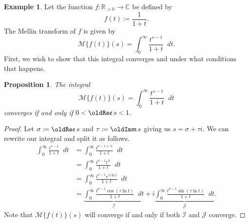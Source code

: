 \documentclass[a4paper]{article}
\newcommand*\diff{\mathop{}\!d} %
\newcommand{\R}{\mathbb{R}}
\newcommand{\C}{\mathbb{C}}
\renewcommand{\Im}{\mathop{\oldIm\mathfrak{m}}}
\renewcommand{\Re}{\mathop{\oldRe\mathfrak{e}}}
\newtheorem{proposition}[theorem]{Proposition}
\theoremstyle{definition}
\newtheorem{example}[theorem]{Example}
\begin{document}
\begin{example}
    Let the function $f \colon \R_{>0} \to \C$ be defined by
    \begin{equation*}
        f(t) \coloneq \frac{1}{1+t}.
    \end{equation*}
    The Mellin transform of $f$ is given by
    \begin{equation*}
        \mathcal{M}\{f(t)\}(s) = \int_0^\infty \frac{t^{s-1}}{1+t} \diff t.
    \end{equation*}
    First, we wish to show that this integral converges and under what conditions that happens.
    \begin{proposition} \label{thm:mellin converge}
        The integral
        \begin{equation*}
            \mathcal{M}\{f(t)\}(s) = \int_0^\infty \frac{t^{s-1}}{1+t} \diff t
        \end{equation*}
        converges if and only if $0 < \Re s < 1$.
    \end{proposition}
    \begin{proof}
        Let $\sigma \coloneq \Re s$ and $\tau \coloneq \Im s$ giving us $s = \sigma + \tau i$.
        We can rewrite our integral and split it as follows.
        \begin{align*}
            \int_0^\infty \frac{t^{s-1}}{1+t} \diff t & = \int_0^\infty \frac{t^{\sigma-1+\tau i}}{1+t} \diff t                                                                                                                                      \\
                                                      & = \int_0^\infty \frac{t^{\sigma-1} t^{\tau i}}{1+t} \diff t                                                                                                                                  \\
                                                      & = \int_0^\infty \frac{t^{\sigma-1} e^{\tau i \ln t}}{1+t} \diff t                                                                                                                            \\
                                                      & = \underbrace{\int_0^\infty \frac{t^{\sigma-1} \cos(\tau \ln t)}{1+t} \diff t}_{\mathcal{I}} + i \underbrace{\int_0^\infty \frac{t^{\sigma-1} \sin(\tau \ln t)}{1+t} \diff t}_{\mathcal{J}}.
        \end{align*}
        Note that $\mathcal{M}\{f(t)\}(s)$ will converge if and only if both $\mathcal{I}$ and $\mathcal{J}$ converge.

\end{proof}
\end{example}
\end{document}
